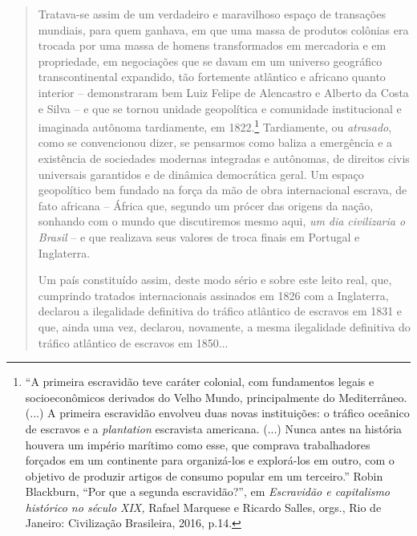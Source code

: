 \begin{quote}
Tratava-se assim de um verdadeiro e maravilhoso espaço de transações
mundiais, para quem ganhava, em que uma massa de produtos colônias era
trocada por uma massa de homens transformados em mercadoria e em
propriedade, em negociações que se davam em um universo geográfico
transcontinental expandido, tão fortemente atlântico e africano quanto
interior -- demonstraram bem Luiz Felipe de Alencastro e Alberto da
Costa e Silva -- e que se tornou unidade geopolítica e comunidade
institucional e imaginada autônoma tardiamente, em 1822.\footnote{``A
  primeira escravidão teve caráter colonial, com fundamentos legais e
  socioeconômicos derivados do Velho Mundo, principalmente do
  Mediterrâneo. (...) A primeira escravidão envolveu duas novas
  instituições: o tráfico oceânico de escravos e a \emph{plantation}
  escravista americana. (...) Nunca antes na história houvera um império
  marítimo como esse, que comprava trabalhadores forçados em um
  continente para organizá-los e explorá-los em outro, com o objetivo de
  produzir artigos de consumo popular em um terceiro.'' Robin Blackburn,
  ``Por que a segunda escravidão?'', em \emph{Escravidão e capitalismo
  histórico no século XIX,} Rafael Marquese e Ricardo Salles, orgs., Rio
  de Janeiro: Civilização Brasileira, 2016, p.14.} Tardiamente, ou
\emph{atrasado}, como se convencionou dizer, se pensarmos como baliza a
emergência e a existência de sociedades modernas integradas e autônomas,
de direitos civis universais garantidos e de dinâmica democrática geral.
Um espaço geopolítico bem fundado na força da mão de obra internacional
escrava, de fato africana -- África que, segundo um prócer das origens
da nação, sonhando com o mundo que discutiremos mesmo aqui, \emph{um}
\emph{dia civilizaria o Brasil} -- e que realizava seus valores de troca
finais em Portugal e Inglaterra.

Um país constituído assim, deste modo sério e sobre este leito real,
que, cumprindo tratados internacionais assinados em 1826 com a
Inglaterra, declarou a ilegalidade definitiva do tráfico atlântico de
escravos em 1831 e que, ainda uma vez, declarou, novamente, a mesma
ilegalidade definitiva do tráfico atlântico de escravos em 1850...


\end{quote}

